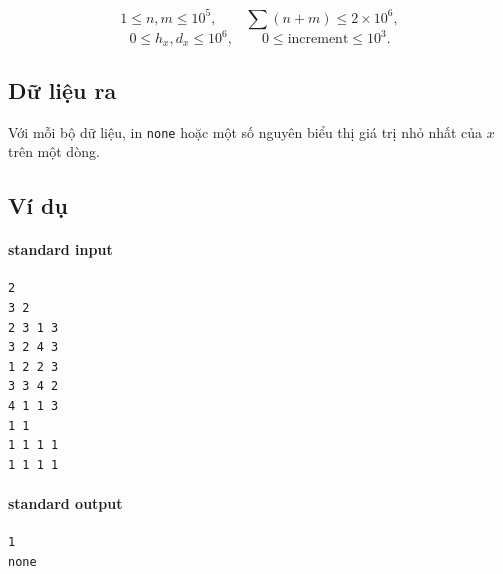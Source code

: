 \documentclass[11pt]{article}
\begin{document}
\[
  1\le n,m\le 10^5,\qquad
  \sum(n+m)\le 2\times 10^6,
\]
\[
  0\le h_x,d_x\le 10^6,\qquad
  0\le \text{increment}\le 10^3.
\]

\subsection*{Dữ liệu ra}

Với mỗi bộ dữ liệu, in \texttt{none} hoặc một số nguyên biểu thị giá trị nhỏ
nhất của \(x\) trên một dòng.

\subsection*{Ví dụ}

\paragraph{standard input}
\begin{verbatim}
2
3 2
2 3 1 3
3 2 4 3
1 2 2 3
3 3 4 2
4 1 1 3
1 1
1 1 1 1
1 1 1 1
\end{verbatim}

\paragraph{standard output}
\begin{verbatim}
1
none
\end{verbatim}
\end{document}
